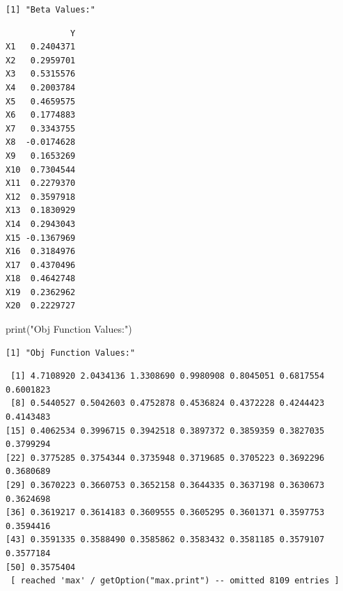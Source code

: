 \documentclass[
  letterpaper,
  DIV=11,
  numbers=noendperiod]{scrartcl}
\newenvironment{Shaded}{\begin{snugshade}}{\end{snugshade}}
\newcommand{\FunctionTok}[1]{\textcolor[rgb]{0.28,0.35,0.67}{#1}}
\newcommand{\NormalTok}[1]{\textcolor[rgb]{0.00,0.23,0.31}{#1}}
\newcommand{\SpecialCharTok}[1]{\textcolor[rgb]{0.37,0.37,0.37}{#1}}
\newcommand{\StringTok}[1]{\textcolor[rgb]{0.13,0.47,0.30}{#1}}
\begin{document}
\begin{verbatim}
[1] "Beta Values:"
\end{verbatim}

\begin{Shaded}
\end{Shaded}

\begin{verbatim}
             Y
X1   0.2404371
X2   0.2959701
X3   0.5315576
X4   0.2003784
X5   0.4659575
X6   0.1774883
X7   0.3343755
X8  -0.0174628
X9   0.1653269
X10  0.7304544
X11  0.2279370
X12  0.3597918
X13  0.1830929
X14  0.2943043
X15 -0.1367969
X16  0.3184976
X17  0.4370496
X18  0.4642748
X19  0.2362962
X20  0.2229727
\end{verbatim}

\begin{Shaded}
\begin{Highlighting}[]
\FunctionTok{print}\NormalTok{(}\StringTok{"Obj Function Values:"}\NormalTok{)}
\end{Highlighting}
\end{Shaded}

\begin{verbatim}
[1] "Obj Function Values:"
\end{verbatim}

\begin{Shaded}
\end{Shaded}

\begin{verbatim}
 [1] 4.7108920 2.0434136 1.3308690 0.9980908 0.8045051 0.6817554 0.6001823
 [8] 0.5440527 0.5042603 0.4752878 0.4536824 0.4372228 0.4244423 0.4143483
[15] 0.4062534 0.3996715 0.3942518 0.3897372 0.3859359 0.3827035 0.3799294
[22] 0.3775285 0.3754344 0.3735948 0.3719685 0.3705223 0.3692296 0.3680689
[29] 0.3670223 0.3660753 0.3652158 0.3644335 0.3637198 0.3630673 0.3624698
[36] 0.3619217 0.3614183 0.3609555 0.3605295 0.3601371 0.3597753 0.3594416
[43] 0.3591335 0.3588490 0.3585862 0.3583432 0.3581185 0.3579107 0.3577184
[50] 0.3575404
 [ reached 'max' / getOption("max.print") -- omitted 8109 entries ]
\end{verbatim}
\end{document}

